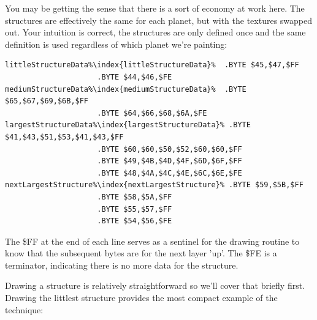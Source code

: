 You may be getting the sense that there is a sort of economy at work here. The structures are effectively
the same for each planet, but with the textures swapped out. Your intuition is correct, the structures
are only defined once and the same definition is used regardless of which planet we're painting:

\begin{lstlisting}[caption=The definitions of three of the structures\index{structures} above\, each of which serves all five planets.,escapechar=\%]
littleStructureData%\index{littleStructureData}%  .BYTE $45,$47,$FF
                     .BYTE $44,$46,$FE
mediumStructureData%\index{mediumStructureData}%  .BYTE $65,$67,$69,$6B,$FF
                     .BYTE $64,$66,$68,$6A,$FE
largestStructureData%\index{largestStructureData}% .BYTE $41,$43,$51,$53,$41,$43,$FF
                     .BYTE $60,$60,$50,$52,$60,$60,$FF
                     .BYTE $49,$4B,$4D,$4F,$6D,$6F,$FF
                     .BYTE $48,$4A,$4C,$4E,$6C,$6E,$FE
nextLargestStructure%\index{nextLargestStructure}% .BYTE $59,$5B,$FF
                     .BYTE $58,$5A,$FF
                     .BYTE $55,$57,$FF
                     .BYTE $54,$56,$FE
\end{lstlisting}

The \$FF at the end of each line serves as a sentinel for the drawing routine to know that the subsequent bytes
are for the next layer 'up'. The \$FE is a terminator, indicating there is no more data for the structure.

Drawing a structure is relatively straightforward so we'll cover that briefly first. Drawing the littlest
structure provides the most compact example of the technique:

